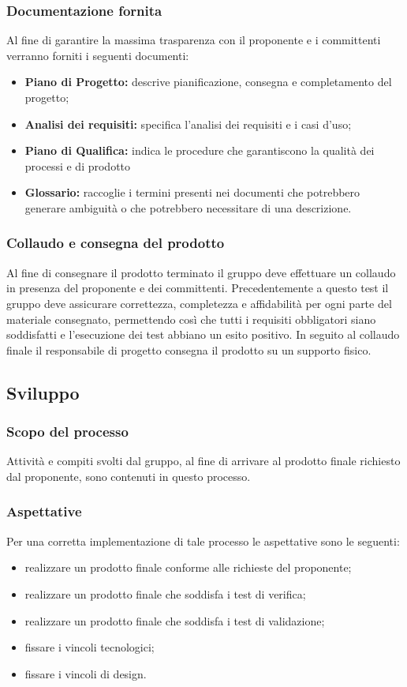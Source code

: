 \subsubsection{Documentazione fornita}
Al fine di garantire la massima trasparenza con il proponente e i committenti verranno forniti i seguenti documenti:
\begin{itemize}
	\item \textbf{Piano di Progetto:} descrive pianificazione, consegna e completamento del progetto;
	\item \textbf{Analisi dei requisiti:} specifica l'analisi dei requisiti e i casi d'uso;
	\item \textbf{Piano di Qualifica:} indica le procedure che garantiscono la qualità dei processi e di prodotto
	\item \textbf{Glossario:} raccoglie i termini presenti nei documenti che potrebbero generare ambiguità o che potrebbero necessitare di una descrizione.
\end{itemize}
\subsubsection{Collaudo e consegna del prodotto}
Al fine di consegnare il prodotto terminato il gruppo deve effettuare un collaudo in presenza del proponente e dei committenti. Precedentemente a questo test il gruppo deve assicurare correttezza, completezza e affidabilità per ogni parte del materiale consegnato, permettendo così che tutti i requisiti obbligatori siano soddisfatti e l'esecuzione dei test abbiano un esito positivo. In seguito al collaudo finale il responsabile di progetto consegna il prodotto su un supporto fisico.                  
\subsection{Sviluppo}
\subsubsection{Scopo del processo}
Attività e compiti svolti dal gruppo, al fine di arrivare al prodotto finale richiesto dal proponente, sono contenuti in questo processo.
\subsubsection{Aspettative}
Per una corretta implementazione di tale processo le aspettative sono le seguenti:
\begin{itemize}
	\item realizzare un prodotto finale conforme alle richieste del proponente;
	\item realizzare un prodotto finale che soddisfa i test di verifica;
	\item realizzare un prodotto finale che soddisfa i test di validazione;
	\item fissare i vincoli tecnologici;
	\item fissare i vincoli di design.
\end{itemize}
